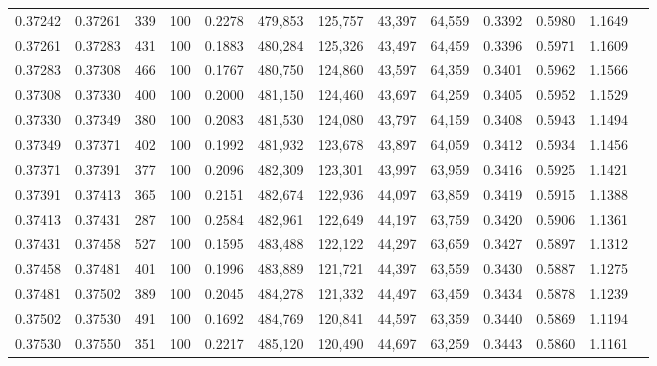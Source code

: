 \begin{tabular}{rrrrrrrrrrrrr}
0.37242 & 0.37261 &    339 & 100 &                                     0.2278 & 479,853 & 125,757 &  43,397 &  64,559 & 0.3392 & 0.5980 & 1.1649 \\
0.37261 & 0.37283 &    431 & 100 &                                     0.1883 & 480,284 & 125,326 &  43,497 &  64,459 & 0.3396 & 0.5971 & 1.1609 \\
0.37283 & 0.37308 &    466 & 100 &                                     0.1767 & 480,750 & 124,860 &  43,597 &  64,359 & 0.3401 & 0.5962 & 1.1566 \\
0.37308 & 0.37330 &    400 & 100 &                                     0.2000 & 481,150 & 124,460 &  43,697 &  64,259 & 0.3405 & 0.5952 & 1.1529 \\
0.37330 & 0.37349 &    380 & 100 &                                     0.2083 & 481,530 & 124,080 &  43,797 &  64,159 & 0.3408 & 0.5943 & 1.1494 \\
0.37349 & 0.37371 &    402 & 100 &                                     0.1992 & 481,932 & 123,678 &  43,897 &  64,059 & 0.3412 & 0.5934 & 1.1456 \\
0.37371 & 0.37391 &    377 & 100 &                                     0.2096 & 482,309 & 123,301 &  43,997 &  63,959 & 0.3416 & 0.5925 & 1.1421 \\
0.37391 & 0.37413 &    365 & 100 &                                     0.2151 & 482,674 & 122,936 &  44,097 &  63,859 & 0.3419 & 0.5915 & 1.1388 \\
0.37413 & 0.37431 &    287 & 100 &                                     0.2584 & 482,961 & 122,649 &  44,197 &  63,759 & 0.3420 & 0.5906 & 1.1361 \\
0.37431 & 0.37458 &    527 & 100 &                                     0.1595 & 483,488 & 122,122 &  44,297 &  63,659 & 0.3427 & 0.5897 & 1.1312 \\
0.37458 & 0.37481 &    401 & 100 &                                     0.1996 & 483,889 & 121,721 &  44,397 &  63,559 & 0.3430 & 0.5887 & 1.1275 \\
0.37481 & 0.37502 &    389 & 100 &                                     0.2045 & 484,278 & 121,332 &  44,497 &  63,459 & 0.3434 & 0.5878 & 1.1239 \\
0.37502 & 0.37530 &    491 & 100 &                                     0.1692 & 484,769 & 120,841 &  44,597 &  63,359 & 0.3440 & 0.5869 & 1.1194 \\
0.37530 & 0.37550 &    351 & 100 &                                     0.2217 & 485,120 & 120,490 &  44,697 &  63,259 & 0.3443 & 0.5860 & 1.1161 \\

\end{tabular}
